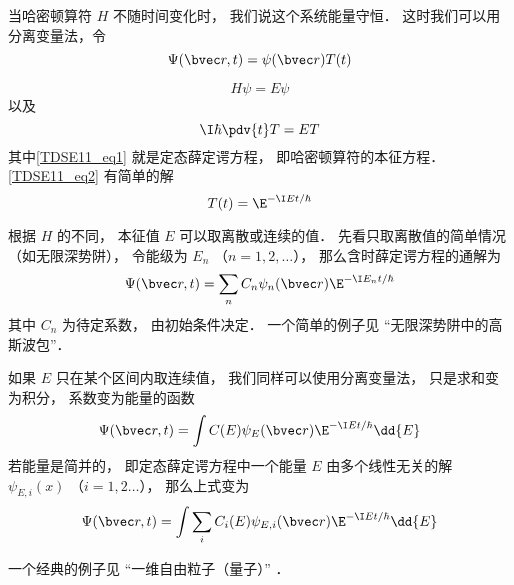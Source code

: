 

当哈密顿算符 $H$ 不随时间变化时， 我们说这个系统能量守恒． 这时我们可以用分离变量法，令
\begin{equation}
\Psi(\bvec r, t) = \psi(\bvec r) T(t)
\end{equation}
 
\begin{equation}\label{TDSE11_eq1}
H\psi = E\psi
\end{equation}
以及
\begin{equation}\label{TDSE11_eq2}
\I \hbar\pdv{t}T = ET
\end{equation}
其中\autoref{TDSE11_eq1} 就是定态薛定谔方程， 即哈密顿算符的本征方程． \autoref{TDSE11_eq2} 有简单的解
\begin{equation}
T(t) = \E^{-\I E t/\hbar}
\end{equation}

根据 $H$ 的不同， 本征值 $E$ 可以取离散或连续的值． 先看只取离散值的简单情况（如无限深势阱）， 令能级为 $E_n$ （$n = 1, 2, \dots$）， 那么含时薛定谔方程的通解为
\begin{equation}\label{TDSE11_eq5}
\Psi(\bvec r, t) = \sum_n C_n \psi_n(\bvec r) \E^{-\I E_n t/\hbar}
\end{equation}
其中 $C_n$ 为待定系数， 由初始条件决定． 一个简单的例子见 “无限深势阱中的高斯波包”．

如果 $E$ 只在某个区间内取连续值， 我们同样可以使用分离变量法， 只是求和变为积分， 系数变为能量的函数
\begin{equation}
\Psi(\bvec r, t) = \int C(E) \psi_E(\bvec r) \E^{-\I E t/\hbar} \dd{E}
\end{equation}
若能量是简并的， 即定态薛定谔方程中一个能量 $E$ 由多个线性无关的解 $\psi_{E,i}(x)$ （$i=1,2\dots$）， 那么上式变为
\begin{equation}\label{TDSE11_eq4}
\Psi(\bvec r, t) = \int \sum_i C_i(E) \psi_{E,i}(\bvec r) \E^{-\I E t/\hbar} \dd{E}
\end{equation}

一个经典的例子见 “一维自由粒子（量子）” ．

